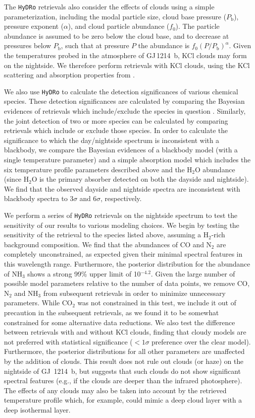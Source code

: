 \documentclass[pdflatex,sn-standardnature]{sn-jnl}%
\begin{document}
The \texttt{HyDRo} retrievals also consider the effects of clouds using a simple parameterization, including the modal particle size, cloud base pressure ($P_\mathrm{b}$), pressure exponent ($\alpha$), and cloud particle abundance ($f_0$). The particle abundance is assumed to be zero below the cloud base, and to decrease at pressures below $P_\mathrm{b}$, such that at pressure $P$ the abundance is $f_0(P/P_\mathrm{b})^\alpha$. Given the temperatures probed in the atmosphere of GJ\,1214~b, KCl clouds may form on the nightside. We therefore perform retrievals with KCl clouds, using the KCl scattering and absorption properties from \citep{pinhas17}.

We also use \texttt{HyDRo} to calculate the detection significances of various chemical species. These detection significances are calculated by comparing the Bayesian evidences of retrievals which include/exclude the species in question \citep{trotta08,benneke13}. Similarly, the joint detection of two or more species can be calculated by comparing retrievals which include or exclude those species. In order to calculate the significance to which the day/nightside spectrum is inconsistent with a blackbody, we compare the Bayesian evidences of a blackbody model (with a single temperature parameter) and a simple absorption model which includes the six temperature profile parameters described above and the H$_2$O abundance (since H$_2$O is the primary absorber detected on both the dayside and nightside). We find that the observed dayside and nightside spectra are inconsistent with blackbody spectra to 3$\sigma$ and 6$\sigma$, respectively.

We perform a series of \texttt{HyDRo} retrievals on the nightside spectrum to test the sensitivity of our results to various modeling choices. We begin by testing the sensitivity of the retrieval to the species listed above, assuming a H$_2$-rich background composition. We find that the abundances of CO and N$_2$ are completely unconstrained, as expected given their minimal spectral features in this wavelength range. Furthermore, the posterior distribution for the abundance of NH$_3$ shows a strong 99\% upper limit of 10$^{-4.2}$. Given the large number of possible model parameters relative to the number of data points, we remove CO, N$_2$ and NH$_3$ from subsequent retrievals in order to minimize unnecessary parameters. While CO$_2$ was not constrained in this test, we include it out of precaution in the subsequent retrievals, as we found it to be somewhat constrained for some alternative data reductions. We also test the difference between retrievals with and without KCl clouds, finding that cloudy models are not preferred with statistical significance ($<1\sigma$ preference over the clear model). Furthermore, the posterior distributions for all other parameters are unaffected by the addition of clouds. This result does not rule out clouds (or haze) on the nightside of GJ~1214~b, but suggests that such clouds do not show significant spectral features (e.g., if the clouds are deeper than the infrared photosphere). The effects of any clouds may also be taken into account by the retrieved temperature profile which, for example, could mimic a deep cloud layer with a deep isothermal layer.
\end{document}
